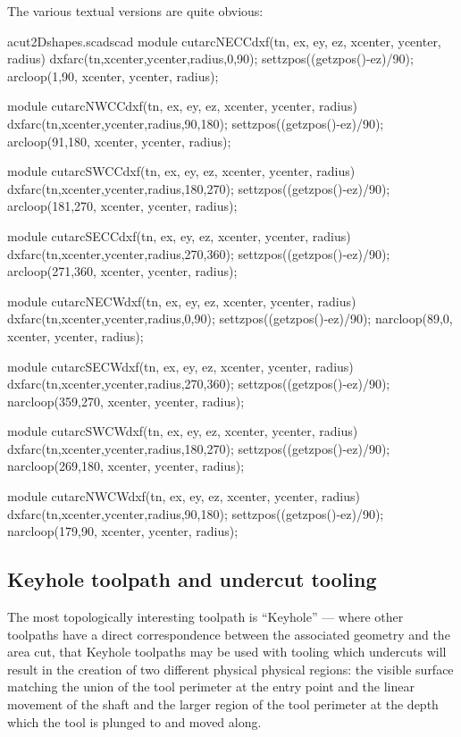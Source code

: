 \documentclass{ltxdoc}
\begin{document}
The various textual versions are quite obvious:

\lstset{firstnumber=\thecuttwod}
\begin{writecode}{a}{cut2Dshapes.scad}{scad}
module cutarcNECCdxf(tn, ex, ey, ez, xcenter, ycenter, radius) {
  dxfarc(tn,xcenter,ycenter,radius,0,90);
  settzpos((getzpos()-ez)/90);
    arcloop(1,90, xcenter, ycenter, radius);
}

module cutarcNWCCdxf(tn, ex, ey, ez, xcenter, ycenter, radius) {
  dxfarc(tn,xcenter,ycenter,radius,90,180);
  settzpos((getzpos()-ez)/90);
    arcloop(91,180, xcenter, ycenter, radius);
}

module cutarcSWCCdxf(tn, ex, ey, ez, xcenter, ycenter, radius) {
  dxfarc(tn,xcenter,ycenter,radius,180,270);
  settzpos((getzpos()-ez)/90);
    arcloop(181,270, xcenter, ycenter, radius);
}

module cutarcSECCdxf(tn, ex, ey, ez, xcenter, ycenter, radius) {
  dxfarc(tn,xcenter,ycenter,radius,270,360);
  settzpos((getzpos()-ez)/90);
    arcloop(271,360, xcenter, ycenter, radius);
}

module cutarcNECWdxf(tn, ex, ey, ez, xcenter, ycenter, radius) {
  dxfarc(tn,xcenter,ycenter,radius,0,90);
  settzpos((getzpos()-ez)/90);
    narcloop(89,0, xcenter, ycenter, radius);
}

module cutarcSECWdxf(tn, ex, ey, ez, xcenter, ycenter, radius) {
  dxfarc(tn,xcenter,ycenter,radius,270,360);
  settzpos((getzpos()-ez)/90);
    narcloop(359,270, xcenter, ycenter, radius);
}

module cutarcSWCWdxf(tn, ex, ey, ez, xcenter, ycenter, radius) {
  dxfarc(tn,xcenter,ycenter,radius,180,270);
  settzpos((getzpos()-ez)/90);
    narcloop(269,180, xcenter, ycenter, radius);
}

module cutarcNWCWdxf(tn, ex, ey, ez, xcenter, ycenter, radius) {
  dxfarc(tn,xcenter,ycenter,radius,90,180);
  settzpos((getzpos()-ez)/90);
    narcloop(179,90, xcenter, ycenter, radius);
}

\end{writecode}
\addtocounter{cuttwod}{40}
 
\subsection{Keyhole toolpath and undercut tooling}
 
\label{subsec:keyholetoolpaths}
The most topologically interesting toolpath is ``Keyhole'' --- where other toolpaths have a 
direct correspondence between the associated geometry and the area cut, that Keyhole toolpaths
may be used with tooling which undercuts will result in the creation of two different physical
physical regions: the visible surface matching the union of the tool perimeter at the entry point
and the linear movement of the shaft and the larger region of the tool perimeter at the depth
which the tool is plunged to and moved along.
 
\end{document}
